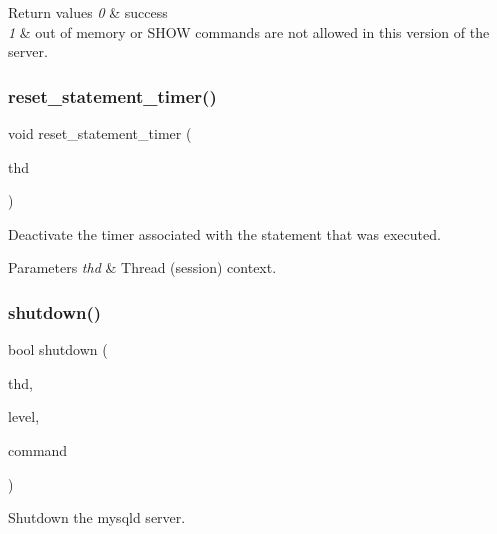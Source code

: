 \begin{DoxyRetVals}{Return values}
{\em 0} & success \\
\hline
{\em 1} & out of memory or S\+H\+OW commands are not allowed in this version of the server. \\
\hline
\end{DoxyRetVals}
\mbox{\label{group__Runtime__Environment_ga3632047b55b1b225c609f0f9ff46250a}} 
\subsubsection{\texorpdfstring{reset\+\_\+statement\+\_\+timer()}{reset\_statement\_timer()}}
{\footnotesize\ttfamily void reset\+\_\+statement\+\_\+timer (\begin{DoxyParamCaption}\item[{T\+HD $\ast$}]{thd }\end{DoxyParamCaption})}

Deactivate the timer associated with the statement that was executed.


\begin{DoxyParams}{Parameters}
{\em thd} & Thread (session) context. \\
\hline
\end{DoxyParams}
\mbox{\label{group__Runtime__Environment_ga12e1f9234a9969980b924de2e3fe487d}} 
\subsubsection{\texorpdfstring{shutdown()}{shutdown()}}
{\footnotesize\ttfamily bool shutdown (\begin{DoxyParamCaption}\item[{T\+HD $\ast$}]{thd,  }\item[{enum mysql\+\_\+enum\+\_\+shutdown\+\_\+level}]{level,  }\item[{enum enum\+\_\+server\+\_\+command}]{command }\end{DoxyParamCaption})}

Shutdown the mysqld server.


